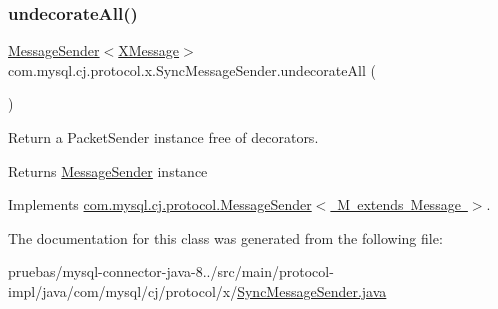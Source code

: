 \subsubsection{\texorpdfstring{undecorate\+All()}{undecorateAll()}}
{\footnotesize\ttfamily \mbox{\hyperlink{interfacecom_1_1mysql_1_1cj_1_1protocol_1_1_message_sender}{Message\+Sender}}$<$\mbox{\hyperlink{classcom_1_1mysql_1_1cj_1_1protocol_1_1x_1_1_x_message}{X\+Message}}$>$ com.\+mysql.\+cj.\+protocol.\+x.\+Sync\+Message\+Sender.\+undecorate\+All (\begin{DoxyParamCaption}{ }\end{DoxyParamCaption})}

Return a Packet\+Sender instance free of decorators.

\begin{DoxyReturn}{Returns}
\mbox{\hyperlink{interfacecom_1_1mysql_1_1cj_1_1protocol_1_1_message_sender}{Message\+Sender}} instance 
\end{DoxyReturn}


Implements \mbox{\hyperlink{interfacecom_1_1mysql_1_1cj_1_1protocol_1_1_message_sender_a8066931f03c2fa9cc705716fa10a4517}{com.\+mysql.\+cj.\+protocol.\+Message\+Sender$<$ M extends Message $>$}}.



The documentation for this class was generated from the following file\+:\begin{DoxyCompactItemize}
\item 
pruebas/mysql-\/connector-\/java-\/8../src/main/protocol-\/impl/java/com/mysql/cj/protocol/x/\mbox{\hyperlink{_sync_message_sender_8java}{Sync\+Message\+Sender.\+java}}\end{DoxyCompactItemize}
